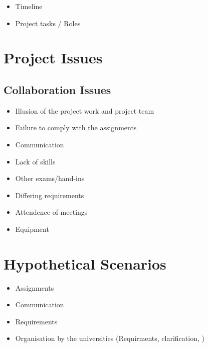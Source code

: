 	\begin{itemize}
		\item Timeline
		\item Project tasks / Roles
	\end{itemize}


\section{Project Issues}

\subsection{Collaboration Issues}

	\begin{itemize}

		\item Illusion of the project work and project team
		\item Failure to comply with the assignments
		\item Communication
		\item Lack of skills
		\item Other exams/hand-ins
		\item Differing requirements
		\item Attendence of meetings
		\item Equipment

	\end{itemize}


\section{Hypothetical Scenarios}

	\begin{itemize}
		\item Assignments
		\item Communication
		\item Requirements
		\item Organisation by the universities (Requirments, clarification, )
	\end{itemize}
